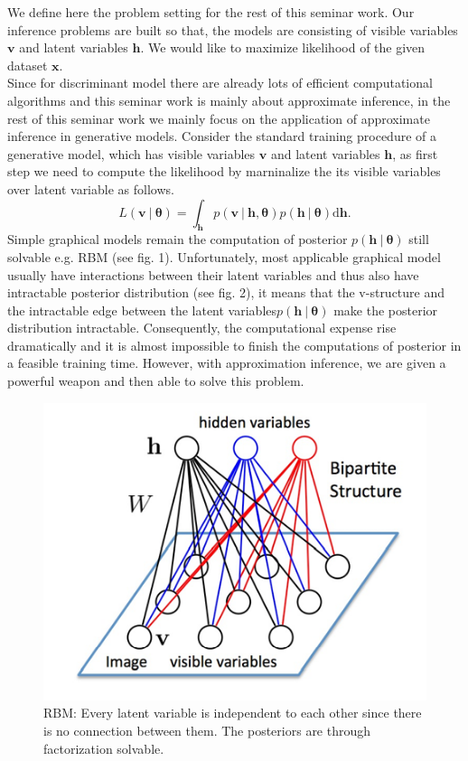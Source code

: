 \documentclass[conference]{IEEEtran}
\begin{document}
We define here the problem setting for the rest of this seminar work. Our inference problems are built so that, the models are consisting of visible variables $\boldsymbol{v}$ and latent variables $\boldsymbol{h}$. We would like to maximize likelihood of the given dataset $\boldsymbol{x}$.\\

Since for discriminant model there are already lots of efficient computational algorithms and this seminar work is mainly about approximate inference, in the rest of this seminar work we mainly focus on the application of approximate inference in generative models. Consider the standard training procedure of a generative model, which has visible variables $\boldsymbol{v}$ and latent variables $\boldsymbol{h}$, as first step we need to compute the likelihood by marninalize the its visible variables over latent variable as follows.
\begin{equation}
  L(\boldsymbol{v}\ |\ \boldsymbol{\theta}) = \int_{\boldsymbol{h}}p(\boldsymbol{v} \ |\ \boldsymbol{h}, \boldsymbol{\theta})p(\boldsymbol{h}\ |\ \boldsymbol{\theta})\mathrm{d}\boldsymbol{h}.
\end{equation}
Simple graphical models remain the computation of posterior $p(\boldsymbol{h}\ |\ \boldsymbol{\theta})$ still solvable e.g. RBM (see fig. 1). Unfortunately, most applicable graphical model usually have interactions between their latent variables and thus also have intractable posterior distribution (see fig. 2), it means that the v-structure and the intractable edge between the latent variables$p(\boldsymbol{h}\ |\ \boldsymbol{\theta})$ make the posterior distribution intractable. Consequently, the computational expense rise dramatically and it is almost impossible to finish the computations of posterior in a feasible training time. However, with approximation inference, we are given a powerful weapon and then able to solve this problem.
\begin{figure}[ht]
	\centering
	\includegraphics[scale=0.8]{picture1.png}
     \caption{RBM: Every latent variable is independent to each other since there is no connection between them. The posteriors are through factorization solvable.}\label{pic_1}
\end{figure}
\end{document}
